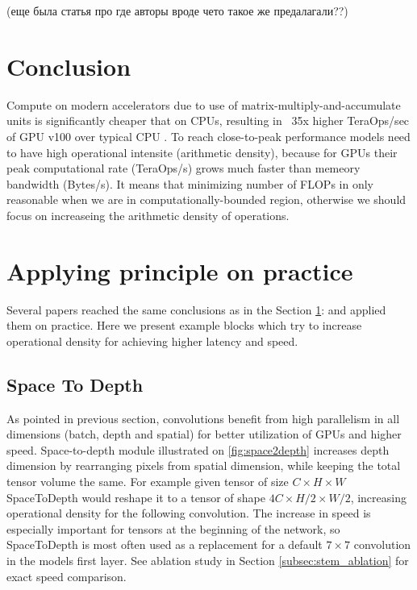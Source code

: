 (еще была статья про \cite{zhou2020_rethinking} где авторы вроде чето такое же предалагали??)

\section{Conclusion} \label{subsec: speed_conclusion}

Compute on modern accelerators due to use of matrix-multiply-and-accumulate units is significantly cheaper that on CPUs, resulting in ~35x higher TeraOps/sec of GPU v100 over typical CPU \cite{li2021_searching}. To reach close-to-peak performance models need to have high operational intensite (arithmetic density), because for GPUs their peak computational rate (TeraOps/s) grows much faster than memeory bandwidth (Bytes/s). It means that minimizing number of FLOPs in only reasonable when we are in computationally-bounded region, otherwise we should focus on increaseing the arithmetic density of operations.  


\section{Applying principle on practice}
Several papers reached the same conclusions as in the Section \ref{subsec: speed_conclusion}: \cite{li2021_searching} \cite{lin2020neural_genet} and applied them on practice. Here we present example blocks which try to increase operational density for achieving higher latency and speed. 


\subsection{Space To Depth} \label{subsec:space2depth}

As pointed in previous section, convolutions benefit from high parallelism in all dimensions (batch, depth and spatial) for better utilization of GPUs and higher speed. Space-to-depth module \cite{ridnik2021_tresnet} \cite{li2021_searching} illustrated on \ref{fig:space2depth} increases depth dimension by rearranging pixels from spatial dimension, while keeping the total tensor volume the same. For example given tensor of size $C \times H \times W$ SpaceToDepth would reshape it to a tensor of shape $4 C \times H / 2 \times W /2$, increasing operational density for the following convolution. The increase in speed is especially important for tensors at the beginning of the network, so SpaceToDepth is most often used as a replacement for a default $7 \times 7$ convolution in the models first layer. See ablation study in Section \ref{subsec:stem_ablation} for exact speed comparison.


